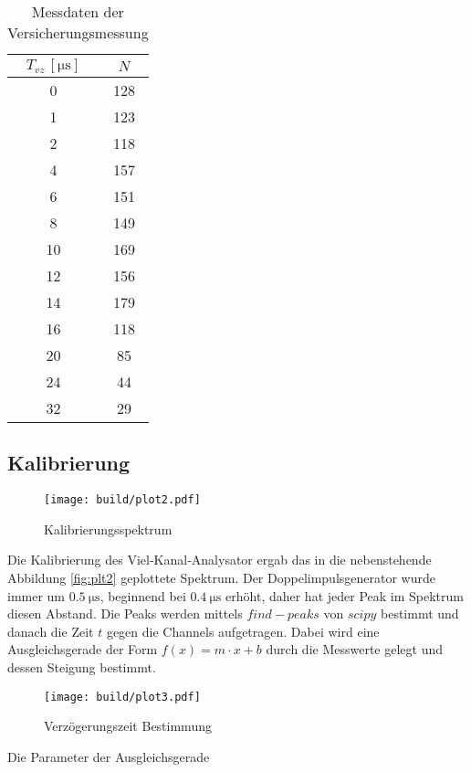 \begin{table}[H]
	\centering
	\begin{tabular}{c c}
		\toprule
		$T_{vz} \, [\unit{\us}]$ & $N $  \\
		\midrule
        0  & 128 \\
        1  & 123 \\
        2  & 118 \\
        4  & 157 \\ 
        6  & 151 \\
        8  & 149 \\
        10 & 169 \\
        12 & 156 \\
        14 & 179 \\
        16 & 118 \\
        20 & 85  \\ 
        24 & 44  \\
        32 & 29  \\
		\bottomrule
	\end{tabular}
    \caption{Messdaten der Versicherungsmessung}
    \label{tab:data1}
\end{table}

\subsection{Kalibrierung}

\begin{wrapfigure}{r}{0.6\textwidth}
	\centering
	\texttt{[image: build/plot2.pdf]}
	\caption{Kalibrierungsspektrum}\label{fig:plt2}
\end{wrapfigure}

Die Kalibrierung des Viel-Kanal-Analysator ergab das in die nebenstehende Abbildung \eqref{fig:plt2} geplottete Spektrum. 
Der Doppelimpulsgenerator wurde immer um $\qty{0.5}{\us}$, beginnend bei $\qty{0.4}{\us}$ erhöht, daher hat jeder Peak im Spektrum diesen Abstand.
Die Peaks werden mittels  $find-peaks$ von $scipy$ \cite{scipy} bestimmt und danach die Zeit $t$ gegen die Channels aufgetragen. 
Dabei wird eine Ausgleichsgerade der Form $f(x)=m \cdot x+b$ durch die Messwerte gelegt und dessen Steigung bestimmt. 


\begin{figure}[H]
	\centering
	\texttt{[image: build/plot3.pdf]}
	\caption{Verzögerungszeit Bestimmung}\label{fig:plt3}
\end{figure}


Die Parameter der Ausgleichsgerade

